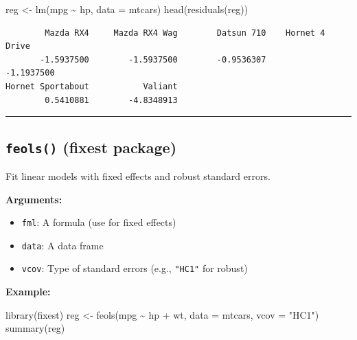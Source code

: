 \documentclass[
  letterpaper,
  DIV=11,
  numbers=noendperiod]{scrreprt}
\newenvironment{Shaded}{\begin{snugshade}}{\end{snugshade}}
\newcommand{\AttributeTok}[1]{\textcolor[rgb]{0.40,0.45,0.13}{#1}}
\newcommand{\FunctionTok}[1]{\textcolor[rgb]{0.28,0.35,0.67}{#1}}
\newcommand{\NormalTok}[1]{\textcolor[rgb]{0.00,0.23,0.31}{#1}}
\newcommand{\OtherTok}[1]{\textcolor[rgb]{0.00,0.23,0.31}{#1}}
\newcommand{\SpecialCharTok}[1]{\textcolor[rgb]{0.37,0.37,0.37}{#1}}
\newcommand{\StringTok}[1]{\textcolor[rgb]{0.13,0.47,0.30}{#1}}
\providecommand{\tightlist}{%
  \setlength{\itemsep}{0pt}\setlength{\parskip}{0pt}}
\begin{document}
\begin{Shaded}
\begin{Highlighting}[]
\NormalTok{reg }\OtherTok{\textless{}{-}} \FunctionTok{lm}\NormalTok{(mpg }\SpecialCharTok{\textasciitilde{}}\NormalTok{ hp, }\AttributeTok{data =}\NormalTok{ mtcars)}
\FunctionTok{head}\NormalTok{(}\FunctionTok{residuals}\NormalTok{(reg))}
\end{Highlighting}
\end{Shaded}

\begin{verbatim}
        Mazda RX4     Mazda RX4 Wag        Datsun 710    Hornet 4 Drive 
       -1.5937500        -1.5937500        -0.9536307        -1.1937500 
Hornet Sportabout           Valiant 
        0.5410881        -4.8348913 
\end{verbatim}

\begin{center}\rule{0.5\linewidth}{0.5pt}\end{center}

\subsection{\texorpdfstring{\texttt{feols()} (fixest
package)}{feols() (fixest package)}}\label{feols-fixest-package}

Fit linear models with fixed effects and robust standard errors.

\textbf{Arguments:}

\begin{itemize}
\tightlist
\item
  \texttt{fml}: A formula (use \texttt{\textbar{}} for fixed effects)
\item
  \texttt{data}: A data frame
\item
  \texttt{vcov}: Type of standard errors (e.g., \texttt{"HC1"} for
  robust)
\end{itemize}

\textbf{Example:}

\begin{Shaded}
\begin{Highlighting}[]
\FunctionTok{library}\NormalTok{(fixest)}
\NormalTok{reg }\OtherTok{\textless{}{-}} \FunctionTok{feols}\NormalTok{(mpg }\SpecialCharTok{\textasciitilde{}}\NormalTok{ hp }\SpecialCharTok{+}\NormalTok{ wt, }\AttributeTok{data =}\NormalTok{ mtcars, }\AttributeTok{vcov =} \StringTok{"HC1"}\NormalTok{)}
\FunctionTok{summary}\NormalTok{(reg)}
\end{Highlighting}
\end{Shaded}
\end{document}
